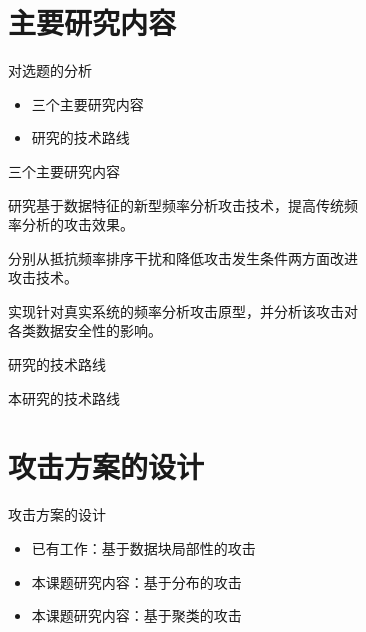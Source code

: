 \documentclass[aspectratio=43]{beamer}
\begin{document}
\section{主要研究内容}

\begin{frame}{对选题的分析}
\begin{card}
\begin{itemize}
    \item 三个主要研究内容
    \item 研究的技术路线
\end{itemize}
\end{card}
\end{frame}

\begin{frame}{三个主要研究内容}
\begin{card}
研究基于数据特征的新型频率分析攻击技术，提高传统频\\[2mm]率分析的攻击效果。
\end{card}
\begin{card}
分别从抵抗频率排序干扰和降低攻击发生条件两方面改进\\[2mm]攻击技术。
\end{card}
\begin{card}
实现针对真实系统的频率分析攻击原型，并分析该攻击对\\[2mm]各类数据安全性的影响。
\end{card}
\end{frame}

\begin{frame}{研究的技术路线}
\centering
{}
\begin{card}
本研究的技术路线
\end{card}   
\end{frame}


\section{攻击方案的设计}

\begin{frame}{攻击方案的设计}
\begin{card}
\begin{itemize}
    \item 已有工作：基于数据块局部性的攻击
    \item 本课题研究内容：基于分布的攻击
    \item 本课题研究内容：基于聚类的攻击
\end{itemize}
\end{card}
\end{frame}
\end{document}

